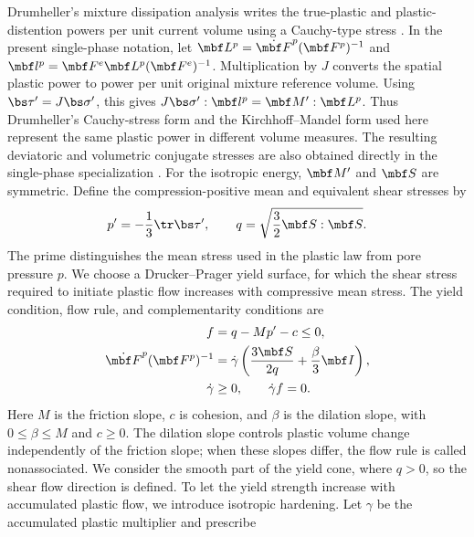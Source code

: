 Drumheller's mixture dissipation analysis writes the true-plastic and
plastic-distention powers per unit current volume using a Cauchy-type stress
\citep[eqs.~(108)--(112)]{drumheller2000}.  In the present single-phase
notation, let
\(\mbf L^p=\dot{\mbf F}^p(\mbf F^p)^{-1}\) and
\(\mbf l^p=\mbf F^e\mbf L^p(\mbf F^e)^{-1}\).  Multiplication by \(J\)
converts the spatial plastic power to power per unit original mixture
reference volume.  Using \(\bs\tau^{\prime}=J\bs\sigma^{\prime}\), this gives
\(J\bs\sigma^{\prime}:\mbf l^p
=\mbf M^{\prime}:\mbf L^p\).  Thus Drumheller's Cauchy-stress form and the
Kirchhoff--Mandel form used here represent the same plastic power in different
volume measures.  The resulting deviatoric and volumetric conjugate stresses
are also obtained directly in the single-phase specialization
\citep[Sec.~3, eq.~(8)]{foster2026nonassociated}.  For the isotropic energy,
\(\mbf M^{\prime}\) and \(\mbf S\) are symmetric.  Define the
compression-positive mean and equivalent shear stresses by
\begin{equation*}
 p^{\prime}=-\frac{1}{3}\tr\bs\tau^{\prime},
 \qquad q=\sqrt{\frac{3}{2}\mbf S:\mbf S}.
\end{equation*}
The prime distinguishes the mean stress used in the plastic law from pore
pressure \(p\).  We choose a Drucker--Prager yield surface, for which the
shear stress required to initiate plastic flow increases with compressive
mean stress.  The yield condition, flow rule, and complementarity conditions are
\begin{align}
 f&=q-Mp^{\prime}-c\leq0,
 \notag
\\
 \dot{\mbf F}^p(\mbf F^p)^{-1}
 &=\dot\gamma\left(\frac{3\mbf S}{2q}+\frac{\beta}{3}\mbf I\right),
 \label{eq:dp-flow}\\
 \dot\gamma&\geq0,
 \qquad \dot\gamma f=0.
 \notag
\end{align}
Here \(M\) is the friction slope, \(c\) is cohesion, and \(\beta\) is the
dilation slope, with \(0\leq\beta\leq M\) and \(c\geq0\).  The dilation
slope controls plastic volume change independently of the friction slope;
when these slopes differ, the flow rule is called nonassociated.  We consider
the smooth part of the yield cone, where \(q>0\), so the shear flow direction
is defined.  To let the yield strength increase with accumulated plastic
flow, we introduce isotropic hardening.  Let
\(\gamma\) be the accumulated plastic multiplier and prescribe
